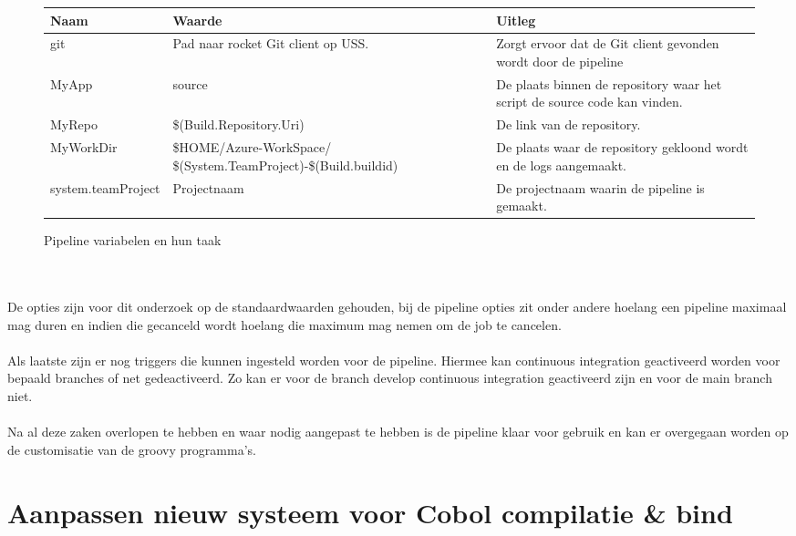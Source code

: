 \begin{figure}[h]
    \begin{tabularx}{1\textwidth} { 
            | >{\centering\arraybackslash}X 
            | >{\centering\arraybackslash}X 
            | >{\centering\arraybackslash}X  | }
        \hline
        \textbf{Naam} & 
        \textbf{Waarde} & 
        \textbf{Uitleg} \\
        \hline
        git &
        Pad naar rocket Git client op USS. &
        Zorgt ervoor dat de Git client gevonden wordt door de pipeline \\ 
        \hline
        MyApp &
        source &
        De plaats binnen de repository waar het script de source code kan vinden. \\ 
        \hline
        MyRepo &
        \$(Build.Repository.Uri) &
        De link van de repository. \\ 
        \hline
        MyWorkDir &
        \$HOME/Azure-WorkSpace/ \$(System.TeamProject)-\$(Build.buildid) &
        De plaats waar de repository gekloond wordt en de logs aangemaakt. \\ 
        \hline
        system.teamProject &
        Projectnaam &
        De projectnaam waarin de pipeline is gemaakt. \\ 
        \hline
    \end{tabularx}
    \caption{Pipeline variabelen en hun taak}
    \label{tab:soorten pipeline variabelen}
\end{figure}
\\ \\
De opties zijn voor dit onderzoek op de standaardwaarden gehouden, bij de pipeline opties zit onder andere hoelang een pipeline maximaal mag duren en indien die gecanceld wordt hoelang die maximum mag nemen om de job te cancelen.  
\\ \\
Als laatste zijn er nog triggers die kunnen ingesteld worden voor de pipeline. Hiermee kan continuous integration geactiveerd worden voor bepaald branches of net gedeactiveerd. Zo kan er voor de branch develop continuous integration geactiveerd zijn en voor de main branch niet. 
\\ \\
Na al deze zaken overlopen te hebben en waar nodig aangepast te hebben is de pipeline klaar voor gebruik en kan er overgegaan worden op de customisatie van de groovy programma's. 

\section{Aanpassen nieuw systeem voor Cobol compilatie \& bind}



